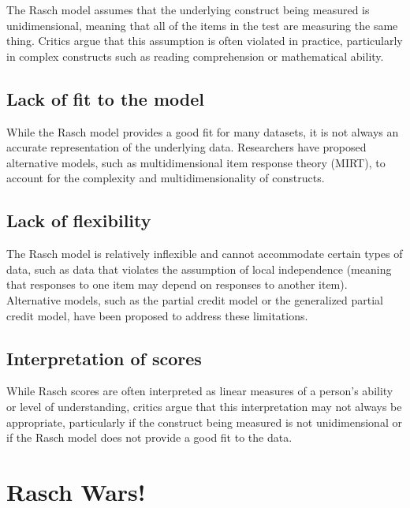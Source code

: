 \documentclass[
  letterpaper,
  DIV=11,
  numbers=noendperiod]{scrreprt}
\begin{document}
The Rasch model assumes that the underlying construct being measured is
unidimensional, meaning that all of the items in the test are measuring
the same thing. Critics argue that this assumption is often violated in
practice, particularly in complex constructs such as reading
comprehension or mathematical ability.

\hypertarget{lack-of-fit-to-the-model}{%
\subsection{Lack of fit to the model}\label{lack-of-fit-to-the-model}}

While the Rasch model provides a good fit for many datasets, it is not
always an accurate representation of the underlying data. Researchers
have proposed alternative models, such as multidimensional item response
theory (MIRT), to account for the complexity and multidimensionality of
constructs.

\hypertarget{lack-of-flexibility}{%
\subsection{Lack of flexibility}\label{lack-of-flexibility}}

The Rasch model is relatively inflexible and cannot accommodate certain
types of data, such as data that violates the assumption of local
independence (meaning that responses to one item may depend on responses
to another item). Alternative models, such as the partial credit model
or the generalized partial credit model, have been proposed to address
these limitations.

\hypertarget{interpretation-of-scores}{%
\subsection{Interpretation of scores}\label{interpretation-of-scores}}

While Rasch scores are often interpreted as linear measures of a
person's ability or level of understanding, critics argue that this
interpretation may not always be appropriate, particularly if the
construct being measured is not unidimensional or if the Rasch model
does not provide a good fit to the data.

\hypertarget{rasch-wars}{%
\section{Rasch Wars!}\label{rasch-wars}}
\end{document}
